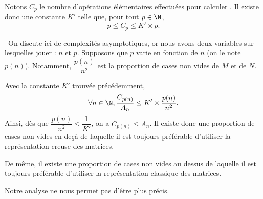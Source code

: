 Notons $C_p$ le nombre d'opérations élémentaires effectuées pour calculer . Il existe donc une constante $K'$ telle que, pour tout $p\in\N$, 
\begin{equation*}
  p \leq C_p \leq K'\times p.
\end{equation*}

\question\ 
On discute ici de complexités asymptotiques, or nous avons deux variables sur lesquelles jouer : $n$ et $p$. Supposons que $p$ varie en fonction de $n$ (on le note $p(n)$). 
Notamment, $\dfrac{p(n)}{n^2}$ est la proportion de cases non vides de $M$ et de $N$.

Avec la constante $K'$ trouvée précédemment,
\begin{equation*}
  \forall n \in \N, \dfrac{C_{p(n)}}{A_n} \leq K' \times \dfrac{p(n)}{n^2}.
\end{equation*}
Ainsi, dès que $\dfrac{p(n)}{n^2} \leq \dfrac{1}{K'}$, on a $C_{p(n)} \leq A_n$. 
Il existe donc une proportion de cases non vides en deçà de laquelle il est toujours préférable d'utiliser la représentation creuse des matrices.

De même, il existe une proportion de cases non vides au dessus de laquelle il est toujours préférable d'utiliser la représentation classique des matrices. 

Notre analyse ne nous permet pas d'être plus précis. 